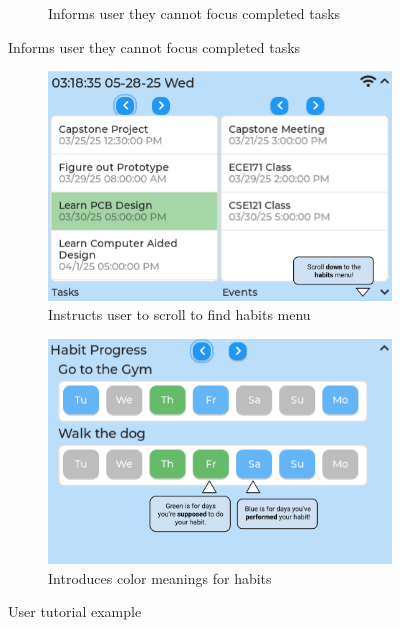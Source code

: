 \begin{figure}
\begin{subfigure}{0.5\textwidth}
        \caption{Informs user they cannot focus completed tasks}
    \end{subfigure}
    \end{figure}
\begin{figure}[h]
	\ContinuedFloat
    \begin{subfigure}{0.5\textwidth}
        \includegraphics[width = \textwidth]{scroll_habits.png}
        \caption{Instructs user to scroll to find habits menu}
    \end{subfigure}
    \begin{subfigure}{0.5\textwidth}
        \includegraphics[width = \textwidth]{habit_tutorial.png}
        \caption{Introduces color meanings for habits}
    \end{subfigure}
\caption{User tutorial example}
\label{fig:user_tutorial}
\end{figure}
